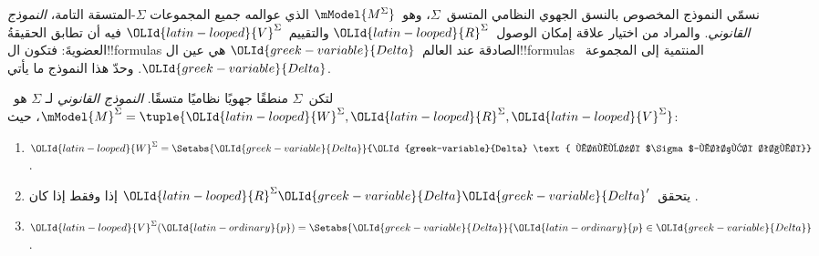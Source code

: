 \documentclass[../../../include/open-logic-section]{subfiles}
\begin{document}


نسمّي النموذج المخصوص بالنسق الجهوي النظامي المتسق~$\Sigma$،
وهو~$\mModel{M^\Sigma}$ الذي عوالمه جميع المجموعات
$\Sigma$-المتسقة التامة، \emph{النموذج القانوني}.
والمراد من اختيار علاقة إمكان الوصول~$\OLId{latin-looped}{R}^\Sigma$ والتقييم~$\OLId{latin-looped}{V}^\Sigma$
فيه أن تطابق الحقيقةُ العضويةَ: فتكون ال!!{formula}s الصادقة
عند العالم~$\OLId{greek-variable}{Delta}$ هي عين ال!!{formula}s المنتمية إلى المجموعة~$\OLId{greek-variable}{Delta}$.
وحدّ هذا النموذج ما يأتي.

\begin{defn}
  لتكن~$\Sigma$ منطقًا جهويًا نظاميًا متسقًا. \emph{النموذج القانوني} لـ
  $\Sigma$ هو~$\mModel{M}^\Sigma = \tuple{\OLId{latin-looped}{W}^\Sigma, \OLId{latin-looped}{R}^\Sigma,
    \OLId{latin-looped}{V}^\Sigma}$، حيث:
  \begin{enumerate}
  \item $\OLId{latin-looped}{W}^\Sigma = \Setabs{\OLId{greek-variable}{Delta}}{\OLId{greek-variable}{Delta} \text{ مجموعة
      $\Sigma$-متسقة تامة}}$.
  \item يتحقق~$\OLId{latin-looped}{R}^\Sigma \OLId{greek-variable}{Delta}\OLId{greek-variable}{Delta}'$ إذا وفقط إذا كان
    .
  \item $\OLId{latin-looped}{V}^\Sigma(\OLId{latin-ordinary}{p}) = \Setabs{\OLId{greek-variable}{Delta}}{\OLId{latin-ordinary}{p} \in \OLId{greek-variable}{Delta}}$.
  \end{enumerate}
\end{defn}
\end{document}
